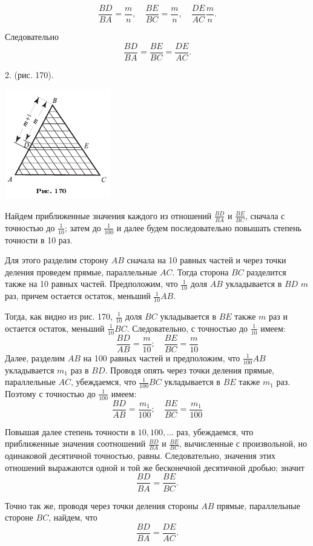 \documentclass[oneside]{book}
\begin{document}
\[\frac{BD}{BA}=\frac mn,\quad
\frac{BE}{BC}=\frac mn,\quad
\frac{DE}{AC}\frac mn.\]

Следовательно
\[\frac{BD}{BA}=\frac{BE}{BC}=\frac{DE}{AC}.\]


2.  (рис. 170).

\includegraphics{pics/ris-170}

Найдем приближенные значения каждого из отношений $\frac{BD}{BA}$ и $\frac{BE}{BC}$, сначала с точностью до $\tfrac1{10}$;
затем до $\tfrac1{100}$ и далее будем последовательно повышать степень точности в 10 раз.

Для этого разделим сторону $AB$ сначала на 10 равных частей и через точки деления проведем прямые, параллельные $AC$.
Тогда сторона $BC$ разделится также на 10 равных частей.
Предположим, что $\tfrac1{10}$ доля $AB$ укладывается в $BD$ $m$ %
раз, причем остается остаток, меньший $\tfrac1{10}AB$.

Тогда, как видно из рис. 170, $\tfrac1{10}$ доля $BC$ укладывается в $BE$ также $m$ раз и остается остаток, меньший $\tfrac1{10}BC$.
Следовательно, с точностью до $\tfrac1{10}$ имеем:
\[\frac{BD}{AB}=\frac{m}{10}; 
\quad
\frac{BE}{BC}=\frac{m}{10}\]
Далее, разделим $AB$ на 100 равных частей и предположим, что $\tfrac1{100}AB$ укладывается $m_1$ раз в $BD$.
Проводя опять через точки деления прямые, параллельные $AC$, убеждаемся, что $\tfrac1{100}BC$ укладывается в $BE$ также $m_1$ раз.
Поэтому с точностью до $\tfrac1{100}$ имеем:
\[\frac{BD}{AB}=\frac{m_1}{100}; 
\quad
\frac{BE}{BC}=\frac{m_1}{100}\]

Повышая далее степень точности в $10,100,\dots$ раз, убеждаемся, что приближенные значения соотношений $\frac{BD}{BA}$ и $\frac{BE}{BC}$, вычисленные с произвольной, но одинаковой десятичной точностью, равны.
Следовательно, значения этих отношений выражаются одной и той же бесконечной десятичной дробью;
значит
\[\frac{BD}{BA}=\frac{BE}{BC}.\]

Точно так же, проводя через точки деления стороны $AB$ прямые, параллельные стороне $BC$, найдем, что
\[\frac{BD}{BA}=\frac{DE}{AC}.\]
\end{document}
